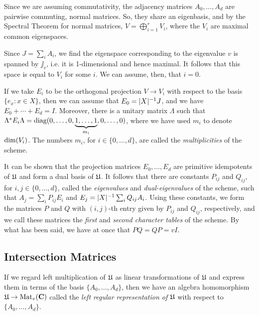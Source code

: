 \documentclass[../../../main]{subfiles}
\begin{document}
 Since we are assuming commutativity, the adjacency matrices $A_0, \dots, A_d$ are pairwise commuting, normal matrices. So, they share an eigenbasis, and by the Spectral Theorem for normal matrices, $V= \bigoplus_{i=1}^r V_i$, where the $V_i$ are maximal common eigenspaces. 
 
 Since $J=\sum_i A_i$, we find the eigenspace corresponding to the eigenvalue $v$ is spanned by $\jj_v$, i.e. it is 1-dimensional and hence maximal. It follows that this space is equal to $V_i$ for some $i$. We can assume, then, that $i=0$.
 
 If we take $E_i$ to be the orthogonal projection $V \rightarrow V_i$ with respect to the basis $\{e_x : x \in X\}$, then we can assume that $E_0=|X|^{-1}J$, and we have $E_0 + \cdots + E_d = I$. Moreover, there is a unitary matrix $\Lambda$ such that $\Lambda^* E_i \Lambda = \text{diag}(0,\dots,0,\underbrace{1,\dots,1}_{m_i},0,\dots,0)$, where we have used $m_i$ to denote $\text{dim}(V_i)$. The numbers $m_i$, for $i \in \{0, \dots, d\}$, are called the {\it multiplicities} of the scheme.
 
 It can be shown \cite[see][Theorem 3.1]{bannaialgebraic} that the projection matrices $E_0, \dots, E_d$ are primitive idempotents of $\mathfrak{U}$ and form a dual basis of $\mathfrak{U}$. It follows that there are constants $P_{ij}$ and $Q_{ij}$, for $i,j \in \{0, \dots, d\}$, called the {\it eigenvalues} and {\it dual-eigenvalues} of the scheme, such that $A_j=\sum_i P_{ij}E_i$ and $E_j=|X|^{-1}\sum_i Q_{ij}A_i$. Using these constants, we form the matrices $P$ and $Q$ with $(i,j)$-th entry given by $P_{ij}$ and $Q_{ij}$, respectively, and we call these matrices the {\it first} and {\it second character tables} of the scheme. By what has been said, we have at once that $PQ=QP=vI$.
 
 \dinkus

 
  \subsection{Intersection Matrices}
 
 If we regard left multiplication of $\mathfrak{U}$ as linear transformations of $\mathfrak{U}$ and express them in terms of the basis $\{A_0, \dots, A_d\}$, then we have an algebra homomorphism $\mathfrak{U} \rightarrow \text{Mat}_v(\mathbf{C})$ called the {\it left regular representation of $\mathfrak{U}$} with respect to $\{A_0, \dots, A_d\}$. 
 
\end{document}
